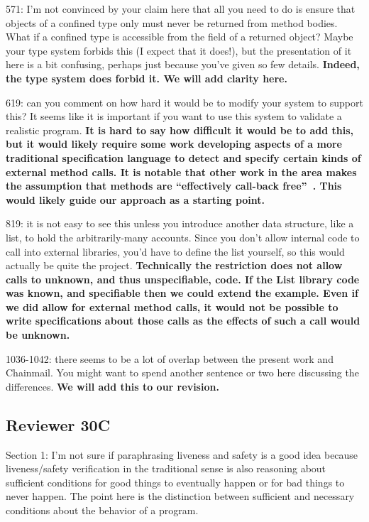 \documentclass[11pt]{amsart}
\newcommand{\us}[1]{\bf #1}
\begin{document}
571: I’m not convinced by your claim here that all you need to do is ensure that objects of a confined type only must never be returned from method bodies. What if a confined type is accessible from the field of a returned object? Maybe your type system forbids this (I expect that it does!), but the presentation of it here is a bit confusing, perhaps just because you’ve given so few details.
{\us{Indeed, the type system does forbid it. We will add clarity here.}}

619: can you comment on how hard it would be to modify your system to support this? It seems like it is important if you want to use this system to validate a realistic program.
{\us{It is hard to say how difficult it would be to add this, but it would likely require some work developing aspects of a more traditional specification language to detect 
and specify certain kinds of external method calls. It is notable that other work in the area makes the assumption that methods are ``effectively call-back free''~\citep{Permenev}. 
This would likely guide our approach as a starting point.}}

819: it is not easy to see this unless you introduce another data structure, like a list, to hold the arbitrarily-many accounts. Since you don’t allow internal code to call into external libraries, you’d have to define the list yourself, so this would actually be quite the project.
{\us{Technically the restriction does not allow calls to unknown, and thus unspecifiable, code. If the List library code was known, 
and specifiable then we could extend the example. Even if we did allow for external method calls, it would not be possible to write
specifications about those calls as the effects of such a call would be unknown.}}

1036-1042: there seems to be a lot of overlap between the present work and Chainmail. You might want to spend another sentence or two here discussing the differences.
{\us{We will add this to our revision.}}
  
 
  \subsection*{Reviewer 30C}
  

Section 1: I'm not sure if paraphrasing liveness and safety is a good
idea because liveness/safety verification in the traditional sense is
also reasoning about sufficient conditions for good things to
eventually happen or for bad things to never happen.  The point
here is the distinction between sufficient and necessary conditions
about the behavior of a program.
\end{document}
